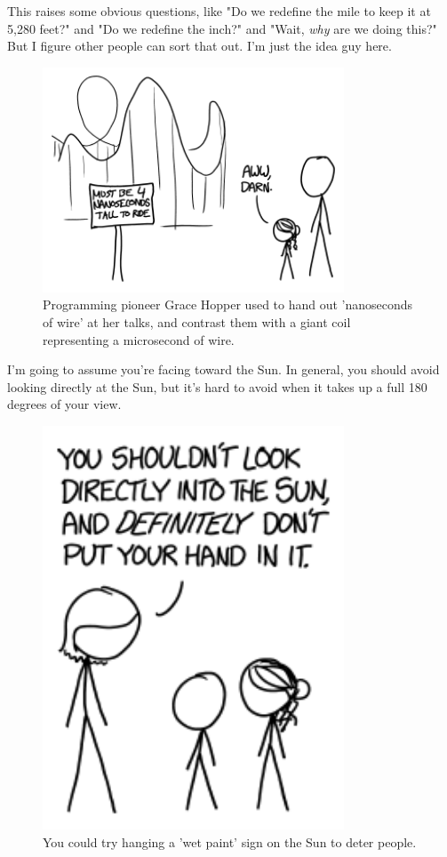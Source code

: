 {{{{This raises some obvious questions, like "Do we redefine the mile to keep it at 5,280 feet?" and "Do we redefine the inch?" and "Wait, \emph{why} are we doing this?" But I figure other people can sort that out. I'm just the idea guy here.} } }

\begin{figure}[!htbp]
\centering
\includegraphics[scale=0.5, max width=0.8\textwidth]{imgs/a/115/foot.png}
\caption{Programming pioneer Grace Hopper used to hand out 'nanoseconds of wire' at her talks, and contrast them with a giant coil representing a microsecond of wire.}
\end{figure}

{I'm going to assume you're facing toward the Sun. In general, you should avoid looking directly at the Sun, but it's hard to avoid when it takes up a full 180 degrees of your view.}

\begin{figure}[!htbp]
\centering
\includegraphics[scale=0.5, max width=0.8\textwidth]{imgs/a/115/sun.png}
\caption{You could try hanging a 'wet paint' sign on the Sun to deter people.}
\end{figure}

}
